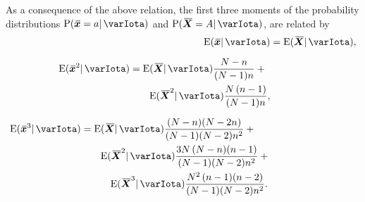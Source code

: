 \documentclass{article}
\theoremstyle{remark}
\theoremstyle{innote}
\renewcommand*{\|}{\mathpunct{|}}%
\newcommand*{\p}{\mathrm{P}}%
\newcommand*{\E}{\mathrm{E}}
\DeclarePairedDelimiter\expp{(}{)}
\newcommand*{\expe}{\E\expp}%
\theoremstyle{simple}
\newcommand*{\widebar}[1]{{\mkern1.5mu\skew{2}\overline{\mkern-1.5mu#1\mkern-1.5mu}\mkern 1.5mu}}
\newcommand*{\av}{\widebar} %
\newcommand*{\sav}{\widebar} %
\newcommand*{\yxx}{x}%
\newcommand*{\yx}{\bm{\yxx}}%
\newcommand*{\yxs}{\sav{\yx}}%
\newcommand*{\yX}{\bm{X}}%
\newcommand*{\yXf}{\av{\yX}}%
\newcommand*{\yH}{\varIota}
\begin{document}
As a consequence of the above relation, the first three moments of the
probability distributions $\p(\yxs=a\|\yH)$ and $\p(\yXf=A\|\yH)$,
are related by
\begin{subequations}\label{noeq:moments}
  \begin{align}
    \expe{\yxs \| \yH} &= \expe{\yXf \| \yH},
    \\[2\jot]
    \begin{split}
    \expe{\yxs^2 \| \yH} &= \expe{\yXf \| \yH}
                                  \frac{N-n}{(N-1)n}
 +{}
\\&\quad\quad \expe{\yXf^2 \| \yH}\frac{N\,(n-1)}{(N-1)n},
\end{split}
    \\[2\jot]
    \begin{split}
    \expe{\yxs^3 \| \yH} &=
                              \expe{\yXf \| \yH}\frac{(N-n)(N-2n)}{(N-1)(N-2)n^2}+{}
                                    \\
                                    &\quad\quad\expe{\yXf^2 \| \yH}
                                    \frac{3N\,(N-n)(n-1)}{(N-1)(N-2)n^2} +{}
                                    \\
                                    &\quad\quad\quad\expe{\yXf^3 \| \yH}
                                    \frac{N^2\,(n-1)(n-2)}{(N-1)(N-2)n^2}.
                                  \end{split}
  \end{align}
\end{subequations}
\end{document}
